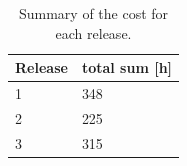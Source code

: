 \documentclass[10pt,a4paper]{article}
\begin{document}
\begin{table}[h!]
\centering
\caption{Summary of the cost for each release.}
\label{table:SumRelease}
\begin{tabular}{| l | l |} \hline
\textbf{Release} & \textbf{total sum [h]} \\ \hline

1 &  348 \\ \hline
2 & 225 \\ \hline
3 & 315 \\ \hline
\end{tabular}\\
\end{table}
\end{document}
